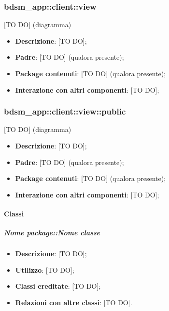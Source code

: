 


	\subsubsection{bdsm\_app::client::view} %
	\label{ssub:bdsm_app_client_view}
	[TO DO] (diagramma) \newline \newline

	\begin{itemize}
		\item \textbf{Descrizione}: [TO DO];
		\item \textbf{Padre}: [TO DO] (qualora presente);
		\item \textbf{Package contenuti}: [TO DO] (qualora presente);
		\item \textbf{Interazione con altri componenti}: [TO DO];
	\end{itemize}

	\subsubsection{bdsm\_app::client::view::public} %
	\label{ssub:bdsm_app_client_view_public}
	[TO DO] (diagramma) \newline \newline

	\begin{itemize}
		\item \textbf{Descrizione}: [TO DO];
		\item \textbf{Padre}: [TO DO] (qualora presente);
		\item \textbf{Package contenuti}: [TO DO] (qualora presente);
		\item \textbf{Interazione con altri componenti}: [TO DO];
	\end{itemize}

		\paragraph{Classi} %
			\subparagraph{Nome package::Nome classe} %
			\label{subp:subparagraph_name}
				\begin{itemize}
					\item \textbf{Descrizione}: [TO DO];
					\item \textbf{Utilizzo}: [TO DO];
					\item \textbf{Classi ereditate}: [TO DO];
					\item \textbf{Relazioni con altre classi}: [TO DO].
				\end{itemize}


